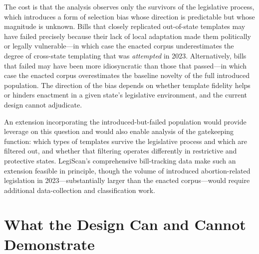 The cost is that the analysis observes only the survivors of the legislative process, which introduces a form of selection bias whose direction is predictable but whose magnitude is unknown. Bills that closely replicated out-of-state templates may have failed precisely because their lack of local adaptation made them politically or legally vulnerable---in which case the enacted corpus underestimates the degree of cross-state templating that was \emph{attempted} in 2023. Alternatively, bills that failed may have been more idiosyncratic than those that passed---in which case the enacted corpus overestimates the baseline novelty of the full introduced population. The direction of the bias depends on whether template fidelity helps or hinders enactment in a given state's legislative environment, and the current design cannot adjudicate.

An extension incorporating the introduced-but-failed population would provide leverage on this question and would also enable analysis of the gatekeeping function: which types of templates survive the legislative process and which are filtered out, and whether that filtering operates differently in restrictive and protective states. LegiScan's comprehensive bill-tracking data make such an extension feasible in principle, though the volume of introduced abortion-related legislation in 2023---substantially larger than the enacted corpus---would require additional data-collection and classification work.

\section{What the Design Can and Cannot Demonstrate}
\label{sec:accounting}

